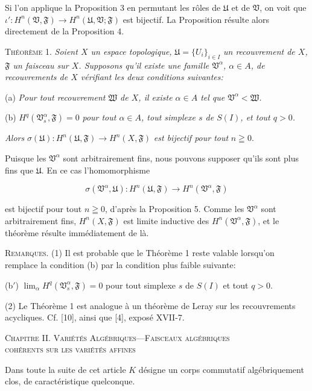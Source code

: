 Si l'on applique la Proposition 3 en permutant les rôles de $\mathfrak{U}$ et de $\mathfrak{V}$, on voit que $\iota': H^n(\mathfrak{V}, \mathfrak{F}) \rightarrow H^n(\mathfrak{U}, \mathfrak{V}; \mathfrak{F})$ est bijectif. La Proposition résulte alors directement de la Proposition 4.

\textsc{Théorème} 1. \textit{Soient $X$ un espace topologique,} $\mathfrak{U} = \{U_i\}_{i \in I}$ \textit{un recouvrement de $X$, $\mathfrak{F}$ un faisceau sur $X$. Supposons qu'il existe une famille $\mathfrak{V}^\alpha$, $\alpha \in A$, de recouvrements de $X$ vérifiant les deux conditions suivantes:}

(a) \textit{Pour tout recouvrement $\mathfrak{W}$ de $X$, il existe $\alpha \in A$ tel que $\mathfrak{V}^\alpha < \mathfrak{W}$.}

(b) $H^q(\mathfrak{V}^\alpha_s , \mathfrak{F}) = 0$ \textit{pour tout $\alpha \in A$, tout simplexe $s$ de $S(I)$, et tout $q > 0$.}

\textit{Alors} $\sigma(\mathfrak{U}): H^n(\mathfrak{U}, \mathfrak{F}) \rightarrow H^n(X, \mathfrak{F})$ \textit{est bijectif pour tout} $n \geqq 0$.

Puisque les $\mathfrak{V}^\alpha$ sont arbitrairement fins, nous pouvons supposer qu'ils sont plus fins que $\mathfrak{U}$. En ce cas l'homomorphisme

\begin{equation*}
\sigma(\mathfrak{V}^\alpha, \mathfrak{U}) : H^n(\mathfrak{U}, \mathfrak{F}) \longrightarrow H^n(\mathfrak{V}^\alpha, \mathfrak{F})
\end{equation*}

est bijectif pour tout $n \geqq 0$, d'après la Proposition 5. Comme les $\mathfrak{V}^\alpha$ sont arbitrairement fins, $H^n(X, \mathfrak{F})$ est limite inductive des $H^n(\mathfrak{V}^\alpha, \mathfrak{F})$, et le théorème résulte immédiatement de là.

\textsc{Remarques}. (1) Il est probable que le Théorème 1 reste valable lorsqu'on remplace la condition (b) par la condition plus faible suivante:

(b$'$) $\lim_\alpha H^q(\mathfrak{V}^\alpha_s , \mathfrak{F}) = 0$ pour tout simplexe $s$ de $S(I)$ et tout $q > 0$.

(2) Le Théorème 1 est analogue à un théorème de Leray sur les recouvrements acycliques. Cf. [10], ainsi que [4], exposé XVII-7.

\begin{center}
\textsc{Chapitre} II. \textsc{Variétés Algébriques---Faisceaux algébriques}\\
\textsc{cohérents sur les variétés affines}
\end{center}

Dans toute la suite de cet article $K$ désigne un corps commutatif algébriquement clos, de caractéristique quelconque.
